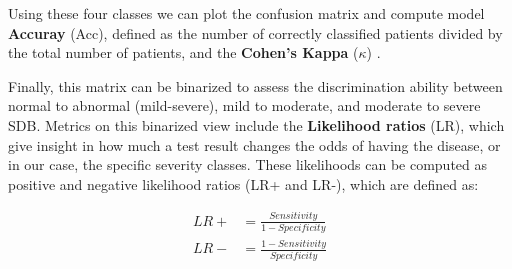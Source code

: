Using these four classes we can plot the confusion matrix and compute model \textbf{Accuray} (Acc), defined as the number of correctly classified patients divided by the total number of patients, and the \textbf{Cohen's Kappa} ($\kappa$) .

Finally, this matrix can be binarized to assess the discrimination ability between normal to abnormal (mild-severe), mild to moderate, and moderate to severe SDB. 
Metrics on this binarized view include the \textbf{Likelihood ratios} (LR), which give insight in how much a test result changes the odds of having the disease, or in our case, the specific severity classes. These likelihoods can be computed as positive and negative likelihood ratios (LR+ and LR-), which are defined as:

\begin{align}
    LR+ &= \frac{Sensitivity}{1-Specificity} \\
    LR- &= \frac{1-Sensitivity}{Specificity} 
\end{align}